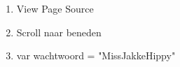 \begin{enumerate}
  \item View Page Source
  \item Scroll naar beneden
  \item var wachtwoord = "MissJakkeHippy"
\end{enumerate}
